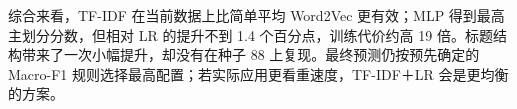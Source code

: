 综合来看，TF-IDF 在当前数据上比简单平均 Word2Vec 更有效；MLP 得到最高主划分分数，但相对 LR 的提升不到 1.4 个百分点，训练代价约高 19 倍。标题结构带来了一次小幅提升，却没有在种子 88 上复现。最终预测仍按预先确定的 Macro-F1 规则选择最高配置；若实际应用更看重速度，TF-IDF＋LR 会是更均衡的方案。
